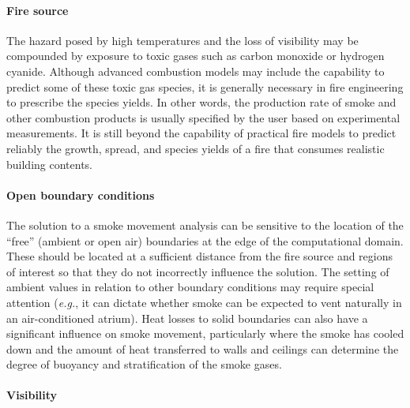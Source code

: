 \documentclass[graybox]{svmult}
\begin{document}
\paragraph{Fire source}

The hazard posed by high temperatures and the loss of visibility may be compounded by exposure to toxic gases such as carbon monoxide or hydrogen cyanide. Although advanced combustion models may include the capability to predict some of these toxic gas species, it is generally necessary in fire engineering to prescribe the species yields. In other words, the production rate of smoke and other combustion products is usually specified by the user based on experimental measurements. It is still beyond the capability of practical fire models to predict reliably the growth, spread, and species yields of a fire that consumes realistic building contents.

\paragraph{Open boundary conditions}

The solution to a smoke movement analysis can be sensitive to the location of the ``free'' (ambient or open air) boundaries at the edge of the computational domain. These should be located at a sufficient distance from the fire source and regions of interest so that they do not incorrectly influence the solution. The setting of ambient values in relation to other boundary conditions may require special attention ({\em e.g.}, it can dictate whether smoke can be expected to vent naturally in an air-conditioned atrium). Heat losses to solid boundaries can also have a significant influence on smoke movement, particularly where the smoke has cooled down and the amount of heat transferred to walls and ceilings can determine the degree of buoyancy and stratification of the smoke gases.

\paragraph{Visibility}
\end{document}

